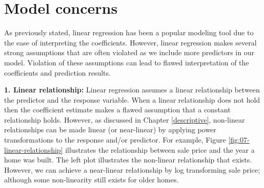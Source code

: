\documentclass[]{book}
\theoremstyle{definition}
\theoremstyle{definition}
\theoremstyle{definition}
\theoremstyle{remark}
\begin{document}
\hypertarget{model-concerns}{%
\section{Model concerns}\label{model-concerns}}

As previously stated, linear regression has been a popular modeling tool
due to the ease of interpreting the coefficients. However, linear
regression makes several strong assumptions that are often violated as
we include more predictors in our model. Violation of these assumptions
can lead to flawed interpretation of the coefficients and prediction
results.

\textbf{1. Linear relationship:} Linear regression assumes a linear
relationship between the predictor and the response variable. When a
linear relationship does not hold then the coefficient estimate makes a
flawed assumption that a constant relationship holds. However, as
discussed in Chapter \ref{descriptive}, non-linear relationships can be
made linear (or near-linear) by applying power transformations to the
response and/or predictor. For example, Figure
\ref{fig:07-linear-relationship} illustrates the relationship between
sale price and the year a home was built. The left plot illustrates the
non-linear relationship that exists. However, we can achieve a
near-linear relationship by log transforming sale price; although some
non-linearity still exists for older homes.
\end{document}
